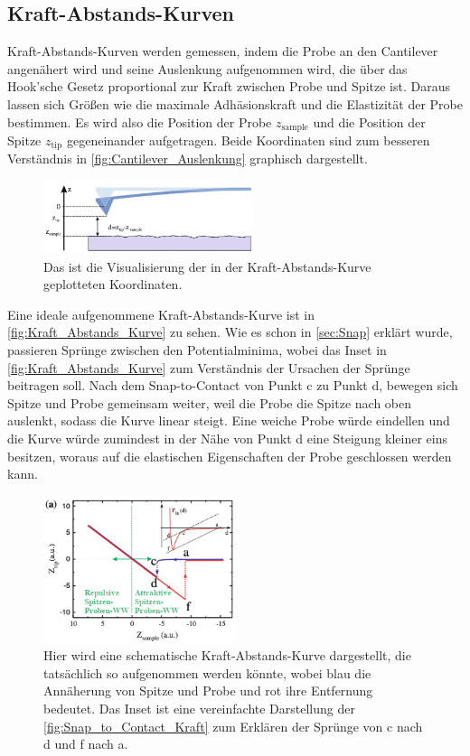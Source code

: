 \subsection{Kraft-Abstands-Kurven}
    Kraft-Abstands-Kurven werden gemessen, indem die Probe an den Cantilever angenähert wird und seine Auslenkung aufgenommen wird, die über das Hook'sche Gesetz proportional zur Kraft zwischen Probe und Spitze ist.
    Daraus lassen sich Größen wie die maximale Adhäsionskraft und die Elastizität der Probe bestimmen.
    Es wird also die Position der Probe $z_{\mathrm{sample}}$ und die Position der Spitze $z_{\mathrm{tip}}$ gegeneinander aufgetragen.
    Beide Koordinaten sind zum besseren Verständnis in \autoref{fig:Cantilever_Auslenkung} graphisch dargestellt.
    \begin{figure}[ht]
        \centering\captionsetup{format=plain}
        \includegraphics[width=0.55\textwidth]{bilder/Cantilever_Auslenkung.png}
        \caption{Das ist die Visualisierung der in der Kraft-Abstands-Kurve geplotteten Koordinaten. \cite{voigtlaender}}
        \label{fig:Cantilever_Auslenkung}
    \end{figure}
    \FloatBarrier
    Eine ideale aufgenommene Kraft-Abstands-Kurve ist in \autoref{fig:Kraft_Abstands_Kurve} zu sehen.
    Wie es schon in \autoref{sec:Snap} erklärt wurde, passieren Sprünge zwischen den Potentialminima, wobei das Inset in \autoref{fig:Kraft_Abstands_Kurve} zum Verständnis der Ursachen der Sprünge beitragen soll.
    Nach dem Snap-to-Contact von Punkt c zu Punkt d, bewegen sich Spitze und Probe gemeinsam weiter, weil die Probe die Spitze nach oben auslenkt, sodass die Kurve linear steigt.
    Eine weiche Probe würde eindellen und die Kurve würde zumindest in der Nähe von Punkt d eine Steigung kleiner eins besitzen, woraus auf die elastischen Eigenschaften der Probe geschlossen werden kann.
    \begin{figure}[ht]
        \centering\captionsetup{format=plain}
        \includegraphics[width=0.5\textwidth]{bilder/Kraft_Abstands_Kurve.png}
        \caption{Hier wird eine schematische Kraft-Abstands-Kurve dargestellt, die tatsächlich so aufgenommen werden könnte, wobei blau die Annäherung von Spitze und Probe und rot ihre Entfernung bedeutet. Das Inset ist eine vereinfachte Darstellung der \autoref{fig:Snap_to_Contact_Kraft} zum Erklären der Sprünge von c nach d und f nach a. \cite{voigtlaender}}
        \label{fig:Kraft_Abstands_Kurve}
    \end{figure}
